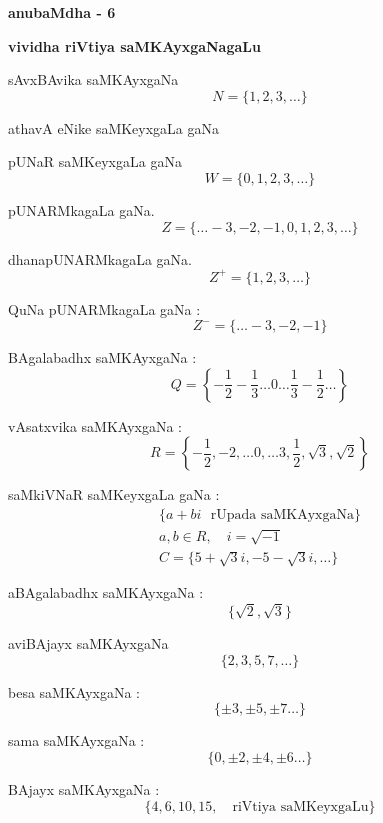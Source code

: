 \newpage

\begin{center}
{\huge\bf anubaMdha - 6}
\bigskip

{\large\bf vividha riVtiya saMKAyxgaNagaLu}

\smallskip
{\large\bf {}}
\end{center}

sAvxBAvika saMKAyxgaNa \ \ 
$$
N=\{1,2,3,\ldots\}
$$

athavA eNike saMKeyxgaLa gaNa \ \ 

pUNaR saMKeyxgaLa gaNa \ \ 
$$
 W=\{0,1,2,3,\ldots\}
$$

pUNARMkagaLa gaNa. \ \ 
$$
Z=\{\ldots -3,-2,-1,0,1,2,3,\ldots\}
$$

dhanapUNARMkagaLa gaNa. \ \ 
$$
Z^{+}=\{1,2,3,\ldots\}
$$

QuNa pUNARMkagaLa gaNa : 
$$
Z^{-}=\{\ldots -3,-2,-1\}
$$

BAgalabadhx saMKAyxgaNa : 
$$
Q=\left\{-\dfrac{1}{2}-\dfrac{1}{3}\ldots 0 \ldots \dfrac{1}{3}-\dfrac{1}{2}\ldots\right\}
$$

vAsatxvika saMKAyxgaNa : 
$$
R=\left\{-\dfrac{1}{2},-2,\ldots 0,\ldots 3,\dfrac{1}{2},\sqrt{3},\sqrt{2}\right\}
$$

\eject

saMkiVNaR saMKeyxgaLa gaNa : 
\begin{gather*}
\{a+bi\text{~~rUpada saMKAyxgaNa}\}\\[2pt]
a,b\in R,\quad i=\sqrt{-1}\\[2pt]
C=\{5+\sqrt{3}i,-5-\sqrt{3}i,\ldots\}
\end{gather*}

aBAgalabadhx saMKAyxgaNa : 
$$
\{\sqrt{2}, \sqrt{3}\}
$$

aviBAjayx saMKAyxgaNa \ \ 
$$
\{2,3,5,7,\ldots\}
$$

besa saMKAyxgaNa : 
$$
\{\pm 3, \pm 5, \pm 7\ldots\}
$$

sama saMKAyxgaNa : 
$$
\{0,\pm 2, \pm 4, \pm 6\ldots\}
$$

BAjayx saMKAyxgaNa : 
$$
\{4,6,10,15,\text{~~ riVtiya saMKeyxgaLu}\}
$$

